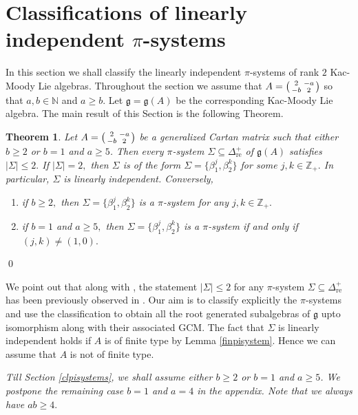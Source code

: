 \documentclass[12pt,reqno]{amsart}
\theoremstyle{plain}
\newtheorem*{thm}{Theorem}
\theoremstyle{definition}
\theoremstyle{remark}
\newcommand{\lie}[1]{\mathfrak{#1}}
\newcommand\bz{\mathbb Z}
\newcommand\bn{\mathbb N}
\begin{document}
\section{Classifications of linearly independent \texorpdfstring{$\pi$}{pi}-systems}\label{lipisystems}
In this section we shall classify the linearly independent $\pi$-systems of rank $2$ Kac-Moody Lie algebras. Throughout the section we assume that $A=\begin{psmallmatrix}2 & -a \\ -b & 2\end{psmallmatrix}$ so that $a,b\in\bn$ and $a\geq b.$ Let $\lie g=\lie g(A)$ be the corresponding Kac-Moody Lie algebra.  The main result of this Section is the following Theorem.
\begin{thm}\label{Thmab}
    Let $A= \begin{psmallmatrix} 2 & -a \\-b & 2 \end{psmallmatrix}$ be a generalized Cartan matrix such that either $b\geq 2$ or $b=1$ and $a\geq 5$. Then every $\pi$-system $\Sigma\subseteq \Delta^+_{\mathrm{re}}$ of $\lie g(A)$ satisfies $|\Sigma|\le 2.$ If $|\Sigma|=2,$ then $\Sigma$ is of the form $\Sigma=\{\beta_1^j,\beta_2^k\}$ for some $j,k\in\bz_+.$ In particular, $\Sigma$ is linearly independent. Conversely,
    \begin{enumerate}
        \item if $b\geq 2,$ then $\Sigma=\{\beta_{1}^{j},\beta_{2}^{k}\}$ is a $\pi$-system for any $j,k\in\bz_+.$
        \item if $b=1$ and $a\geq 5,$ then $\Sigma=\{\beta_{1}^{j},\beta_{2}^{k}\}$ is a $\pi$-system if and only if $(j,k)\neq (1,0).$
    \end{enumerate}
\end{thm}\qed

We point out that along with \cite[Theorem 1]{habib2023root}, the statement $|\Sigma|\le 2$ for any $\pi$-system $\Sigma\subseteq\Delta^+_{\mathrm{re}}$ has been previously observed in \cite[Theorem 4.8]{carbone2021commutator}. Our aim is to classify explicitly the $\pi$-systems and use the classification to obtain all the root generated subalgebras of $\lie g$ upto isomorphism along with their associated GCM. The fact that $\Sigma$ is linearly independent holds if $A$ is of finite type by Lemma \ref{finpisystem}. Hence we can assume that $A$ is not of finite type. \medskip

\textit{Till Section \ref{clpisystems}, we shall assume either $b\geq 2$ or $b=1$ and $a\geq 5$. We postpone the remaining case $b=1$ and $a=4$ in the appendix. Note that we always have $ab\geq 4.$}\medskip
\end{document}
